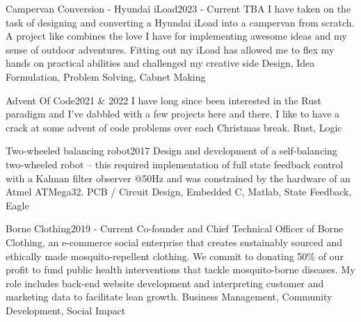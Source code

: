 %
%
%


\begin{projects}
	\project
	{Campervan Conversion - Hyundai iLoad}{2023 - Current}
	{TBA}
	{I have taken on the task of designing and converting a Hyundai iLoad into a campervan from scratch. A project like combines the love I have for implementing awesome ideas and my sense of outdoor adventures.
	Fitting out my iLoad has allowed me to flex my hands on practical abilities and challenged my creative side}
	{Design, Idea Formulation, Problem Solving, Cabnet Making}

	\project
	{Advent Of Code}{2021 \& 2022}
	{}
	{I have long since been interested in the Rust paradigm and I've dabbled with a few projects here and there. I like to have a crack at some advent of code problems over each Christmas break.}
	{Rust, Logic}

	\project
	{Two-wheeled balancing robot}{2017}
	{}
	{Design and development of a self-balancing two-wheeled robot – this required
	implementation of full state feedback control with a Kalman filter observer @50Hz and was constrained by the
	hardware of an Atmel ATMega32.}
	{PCB / Circuit Design, Embedded C, Matlab, State Feedback, Eagle}

	\project
	{Borne Clothing}{2019 - Current}
	{}
	{Co-founder and Chief Technical Officer of Borne Clothing, an e-commerce social enterprise that creates sustainably sourced and ethically made mosquito-repellent clothing. We commit to donating 50\% of our profit to fund public health interventions that tackle mosquito-borne diseases. My role includes back-end website development and interpreting customer and marketing data to facilitate lean growth.}
	{Business Management, Community Development, Social Impact}

\end{projects}